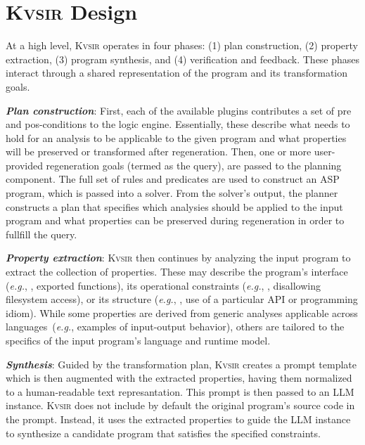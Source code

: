 \documentclass[sigplan]{acmart}
\def\eg{{\em e.g.}, }
\newcommand{\sys}{{\scshape Kv{\textalpha}sir}\xspace}
\newcommand{\heading}[1]{\vspace{2pt}\noindent\textbf{\emph{#1}}:\enspace}
\begin{document}

\section{\sys Design}
\label{sec:design}

At a high level, \sys operates in four phases: (1) plan construction, (2)
property extraction, (3) program synthesis, and (4) verification and feedback.
These phases interact through a shared representation of the program and its
transformation goals.

\heading{Plan construction}
First, each of the available plugins contributes a set of pre and pos-conditions 
to the logic engine.
Essentially, these describe what needs to hold for an analysis to be applicable to the given 
program and what properties will be preserved or transformed after regeneration.
Then, one or more user-provided regeneration goals (termed as the query), are passed to the planning component.
The full set of rules and predicates are used to construct an ASP program,
which is passed into a solver.
From the solver's output, the planner constructs a plan that specifies which
analysies should be applied to the input program and what properties can be
preserved during regeneration in order to fullfill the query.

\heading{Property extraction} \sys then continues by analyzing the input program to
extract the collection of properties.
These may describe the program's interface
(\eg, exported functions), its operational constraints (\eg, disallowing
filesystem access), or its structure (\eg, use of a particular API or programming idiom).
While some properties are derived from generic analyses
applicable across languages~(\eg examples of input-output behavior), others are tailored to the specifics of the input program's language and runtime model.

\heading{Synthesis}
Guided by the transformation plan, \sys creates a prompt template which is then
augmented with the extracted properties, having them normalized to a human-readable text represantation.
This prompt is then passed to an LLM instance.
\sys does not include by default the original program's source code in the prompt.
Instead, it uses the extracted properties to guide the LLM instance 
to synthesize a candidate program that satisfies the specified constraints.
\end{document}
